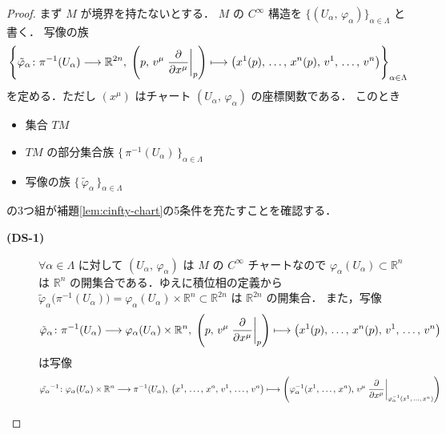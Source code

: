 \documentclass[TQFT_main]{subfiles}
\begin{document}
\begin{proof}
    まず $M$ が境界を持たないとする．
    $M$ の $C^\infty$ 構造を $\{(U_\alpha,\, \varphi_\alpha)\}_{\alpha \in \Lambda}$ と書く．
    写像の族
    \begin{align}
        \left\{\tilde{\varphi}_\alpha \colon \pi^{-1} (U_\alpha) \lto \mathbb{R}^{2n},\; \left(p,\, v^\mu \eval{\pdv{}{x^\mu}}_p \right) \lmto \bigl( x^1 (p),\, \dots,\, x^n(p),\, v^1,\, \dots,\, v^n \bigr) \right\}_{\alpha \in \Lambda}
    \end{align}
    を定める．ただし $(x^\mu)$ はチャート $(U_\alpha,\, \varphi_\alpha)$ の座標関数である．
    このとき
    \begin{itemize}
        \item 集合 $TM$
        \item $TM$ の部分集合族 $\bigl\{\, \pi^{-1}(U_\alpha) \,\bigr\}_{\alpha \in \Lambda}$
        \item 写像の族 $\bigl\{\, \tilde{\varphi}_\alpha \,\bigr\}_{\alpha \in \Lambda}$
    \end{itemize}
    の3つ組が補題\ref{lem:cinfty-chart}の5条件を充たすことを確認する．
    \begin{description}
        \item[\textbf{(DS-1)}] $\forall \alpha \in \Lambda$ に対して $(U_\alpha,\, \varphi_\alpha)$ は $M$ の $C^\infty$ チャートなので $\varphi_\alpha(U_\alpha) \subset \mathbb{R}^n$ は $\mathbb{R}^n$ の開集合である．ゆえに積位相の定義から $\tilde{\varphi}_\alpha \bigl( \pi^{-1} (U_\alpha) \bigr) = \varphi_\alpha (U_\alpha) \times \mathbb{R}^n \subset \mathbb{R}^{2n}$ は $\mathbb{R}^{2n}$ の開集合．
        また，写像
        \begin{align}
            \tilde{\varphi}_\alpha \colon \pi^{-1} (U_\alpha) \lto \varphi_\alpha (U_\alpha) \times \mathbb{R}^n,\; \left(p,\, v^\mu \eval{\pdv{}{x^\mu}}_p \right) \lmto \bigl( x^1 (p),\, \dots,\, x^n(p),\, v^1,\, \dots,\, v^n \bigr) 
        \end{align}
        は写像
        \begin{align}
            \tilde{\varphi_\alpha}^{-1} \colon \varphi_\alpha(U_\alpha) \times \mathbb{R}^n \lto \pi^{-1} (U_\alpha),\; \bigl( x^1,\, \dots,\, x^n,\, v^1,\, \dots,\, v^n \bigr) \lmto \left(\varphi_\alpha^{-1}(x^1,\, \dots,\, x^n),\, v^\mu \eval{\pdv{}{x^\mu}}_{\varphi_\alpha^{-1}(x^1,\, \dots,\, x^n)} \right)
        \end{align}

\end{description}
\end{proof}
\end{document}
